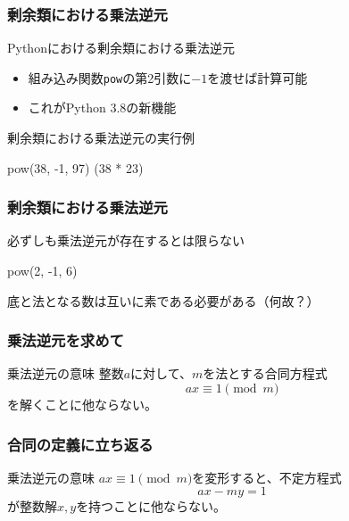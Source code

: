\documentclass[aspectratio=169,dvipdfmx,14pt,notheorems]{beamer}
\theoremstyle{definition}
\begin{document}
\begin{frame}[fragile]\frametitle{剰余類における乗法逆元}

\begin{block}{Pythonにおける剰余類における乗法逆元}
\begin{itemize}
\item 組み込み関数\texttt{pow}の第2引数に$-1$を渡せば計算可能
\item これがPython 3.8の新機能
\end{itemize}
\end{block}

\begin{exampleblock}{剰余類における乗法逆元の実行例}

\begin{pyconsole}
pow(38, -1, 97)
(38 * 23) %
\end{pyconsole}

\end{exampleblock}

\end{frame}

\begin{frame}[fragile]\frametitle{剰余類における乗法逆元}

\begin{alertblock}{必ずしも乗法逆元が存在するとは限らない}

\begin{pyconsole}
pow(2, -1, 6)
\end{pyconsole}
\end{alertblock}
底と法となる数は互いに素である必要がある（何故？）
\end{frame}

\begin{frame}[fragile]\frametitle{乗法逆元を求めて}

\begin{block}{乗法逆元の意味}
整数$a$に対して、$m$を法とする合同方程式
\begin{equation*}
ax \equiv 1 \pmod{m}
\end{equation*}
を解くことに他ならない。
\end{block}

\end{frame}

\begin{frame}[fragile]\frametitle{合同の定義に立ち返る}

\begin{block}{乗法逆元の意味}
$ax \equiv 1 \pmod{m}$を変形すると、不定方程式
\begin{equation*}
ax -my = 1
\end{equation*}
が整数解$x, y$を持つことに他ならない。
\end{block}

\end{frame}
\end{document}
